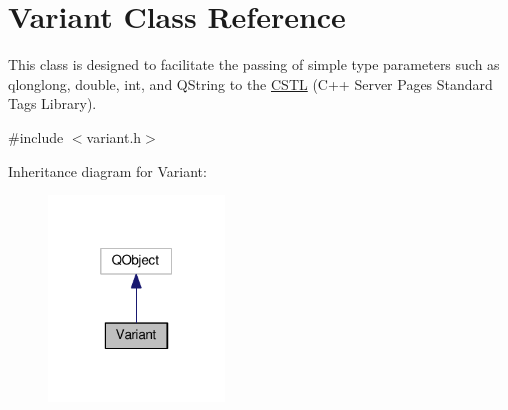 \hypertarget{class_variant}{}\section{Variant Class Reference}
\label{class_variant}


This class is designed to facilitate the passing of simple type parameters such as qlonglong, double, int, and Q\+String to the \hyperlink{namespace_c_s_t_l}{C\+S\+TL} (C++ Server Pages Standard Tags Library).  




{\ttfamily \#include $<$variant.\+h$>$}



Inheritance diagram for Variant\+:\nopagebreak
\begin{figure}[H]
\begin{center}
\leavevmode
\includegraphics[width=133pt]{class_variant__inherit__graph}
\end{center}
\end{figure}
